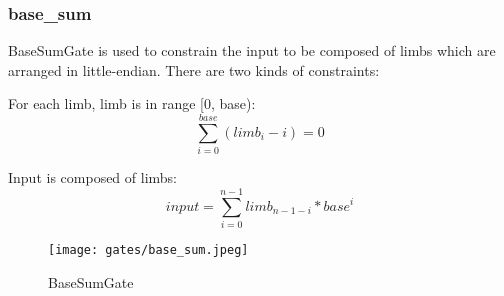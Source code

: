 \subsubsection{base\_sum}

BaseSumGate is used to constrain the input to be composed of limbs which are arranged in little-endian. There are two kinds of constraints:

For each limb, limb is in range [0, base):
\[\sum_{i=0}^{base}(limb_i - i) = 0\]

Input is composed of limbs:
\[input = \sum_{i=0}^{n-1} limb_{n-1-i} * base^i\]

\begin{figure}[!h]
    \centering
    \texttt{[image: gates/base\_sum.jpeg]}
    \caption{BaseSumGate}
    \label{fig:base-sum}
\end{figure}